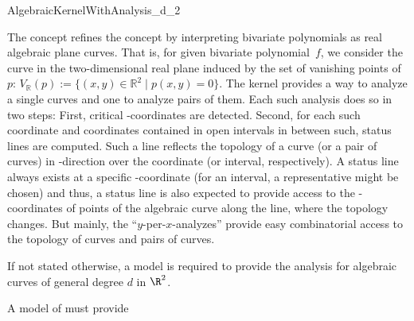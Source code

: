 \begin{ccRefConcept}{AlgebraicKernelWithAnalysis_d_2} 

\ccDefinition

The  concept refines
the  concept by interpreting bivariate polynomials
as real algebraic plane curves. That is, for given bivariate polynomial~$f$,
we consider the curve in the two-dimensional real plane induced by the set of
vanishing points of~$p$: $V_\mathbb{R}(p) := \{(x,y) \in \mathbb{R}^2
\mid p(x,y) = 0 \}$. The kernel provides a way to analyze a single
curves and one to analyze pairs of them. Each such analysis does so in two
steps: First, critical -coordinates are detected. Second, for each such
coordinate and coordinates contained in open
intervals in between such, status lines are computed. Such a line reflects
the topology of a curve (or a pair of curves) in -direction
over the coordinate (or interval, respectively). A status line always exists at
a specific -coordinate (for an interval, a representative might be
chosen) and thus, a status line is also expected to provide access to the
-coordinates of points of the algebraic curve along the line, where the
topology changes. But mainly, the ``$y$-per-$x$-analyzes'' provide easy
combinatorial access to the topology of curves and pairs of curves. 

If not stated otherwise, a model is required to 
provide the analysis for algebraic curves of general degree $d$ in $\R^2$.

\ccRefines
{}

\ccTypes \ccThree{}{+++++++++++++}{++++++++}

A model of  must provide

\ccGlue
{}

\ccHasModels


\ccSeeAlso



\end{ccRefConcept}
